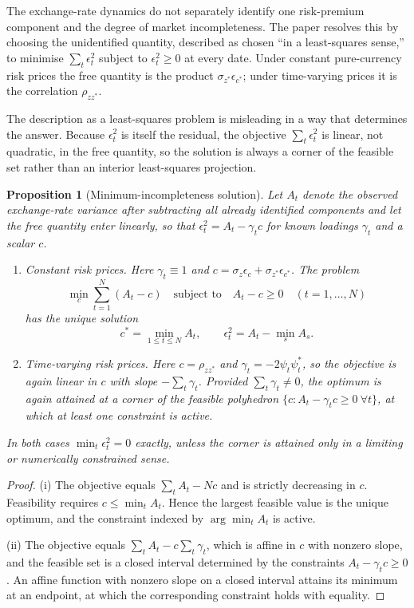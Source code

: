 \documentclass[11pt]{article}
\newtheorem{proposition}{Proposition}
\theoremstyle{definition}
\begin{document}
The exchange-rate dynamics do not separately identify one risk-premium component and the degree of market incompleteness. The paper resolves this by choosing the unidentified quantity, described as chosen ``in a least-squares sense,'' to minimise $\sum_t\epsilon_t^2$ subject to $\epsilon_t^2\ge0$ at every date. Under constant pure-currency risk prices the free quantity is the product $\sigma_{z^*}\epsilon_{c^*}$; under time-varying prices it is the correlation $\rho_{zz^*}$.

The description as a least-squares problem is misleading in a way that determines the answer. Because $\epsilon_t^2$ is itself the residual, the objective $\sum_t\epsilon_t^2$ is linear, not quadratic, in the free quantity, so the solution is always a corner of the feasible set rather than an interior least-squares projection.

\begin{proposition}[Minimum-incompleteness solution]\label{prop:min_incomplete}
Let $A_t$ denote the observed exchange-rate variance after subtracting all already identified components and let the free quantity enter linearly, so that $\epsilon_t^2=A_t-\gamma_tc$ for known loadings $\gamma_t$ and a scalar $c$.
\begin{enumerate}[label=(\roman*)]
\item Constant risk prices. Here $\gamma_t\equiv1$ and $c=\sigma_z\epsilon_c+\sigma_{z^*}\epsilon_{c^*}$. The problem
\begin{equation}\label{eq:min_incomplete_problem}
\min_c\sum_{t=1}^N(A_t-c)
\quad\text{subject to}\quad A_t-c\ge0\quad(t=1,\ldots,N)
\end{equation}
has the unique solution
\begin{equation}\label{eq:min_incomplete_solution}
c^*=\min_{1\le t\le N}A_t,
\qquad
\epsilon_t^2=A_t-\min_s A_s.
\end{equation}
\item Time-varying risk prices. Here $c=\rho_{zz^*}$ and $\gamma_t=-2\psi_t\psi_t^*$, so the objective is again linear in $c$ with slope $-\sum_t\gamma_t$. Provided $\sum_t\gamma_t\ne0$, the optimum is again attained at a corner of the feasible polyhedron $\{c:A_t-\gamma_tc\ge0\ \forall t\}$, at which at least one constraint is active.
\end{enumerate}
In both cases $\min_t\epsilon_t^2=0$ exactly, unless the corner is attained only in a limiting or numerically constrained sense.
\end{proposition}

\begin{proof}
(i) The objective equals $\sum_tA_t-Nc$ and is strictly decreasing in $c$. Feasibility requires $c\le\min_tA_t$. Hence the largest feasible value is the unique optimum, and the constraint indexed by $\arg\min_tA_t$ is active.

(ii) The objective equals $\sum_tA_t-c\sum_t\gamma_t$, which is affine in $c$ with nonzero slope, and the feasible set is a closed interval determined by the constraints $A_t-\gamma_tc\ge0$. An affine function with nonzero slope on a closed interval attains its minimum at an endpoint, at which the corresponding constraint holds with equality.
\end{proof}
\end{document}
